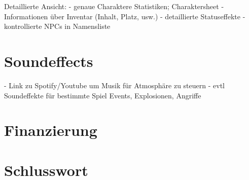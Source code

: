 \documentclass[11pt]{article}
\begin{document}
    Detaillierte Ansicht:
    - genaue Charaktere Statistiken; Charaktersheet
    - Informationen über Inventar (Inhalt, Platz, usw.)
    - detaillierte Statuseffekte
    - kontrollierte NPCs in Namensliste

    \section{Soundeffects}\label{sec:soundeffects}
    - Link zu Spotify/Youtube um Musik für Atmosphäre zu steuern
    - evtl Soundeffekte für bestimmte Spiel Events, Explosionen, Angriffe
    
    \section{Finanzierung}\label{sec:chapter_financials}


    \section{Schlusswort}\label{sec:chapter_finish}
\end{document}
